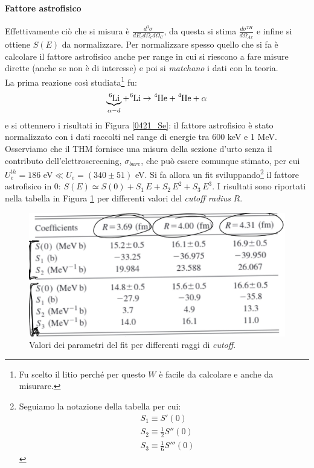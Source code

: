 \paragraph{Fattore astrofisico} Effettivamente ciò che si misura è $\frac{d^3\sigma}{dE_c d\Omega_cd\Omega_{C}}$, da questa si stima $\frac{d\sigma^{TH}}{d\Omega_{Ax}}$ e infine si ottiene $S(E)$ da normalizzare.
Per  normalizzare spesso quello che si fa è calcolare il fattore astrofisico anche per range in cui si riescono a fare misure dirette (anche se non è di interesse) e poi si \textit{matchano} i dati con la teoria.\\
La prima reazione così studiata\footnote{Fu scelto il litio perché per questo $W$ è facile da calcolare e anche da misurare.} fu:
$$ \underbrace{\ce{^6Li}}_{\alpha-d} + \ce{^6Li} \to \ce{^4He} + \ce{^4He} + \alpha $$
e si ottennero i risultati in Figura \ref{0421_Se}: il fattore astrofisico è stato normalizzato con i dati raccolti nel range di energie tra 600 keV e 1 MeV. Osserviamo che il THM fornisce una misura della sezione d'urto senza il contributo dell'elettroscreening, $\sigma_{bare}$, che può essere comunque stimato, per cui $U_e^{th}=186$ eV$\ll U_e = (340\pm 51)$ eV.
\noindent Si fa allora un fit sviluppando\footnote{Seguiamo la notazione della tabella per cui:%
\begin{align*}%
	&S_1 \equiv S'(0) \\
	&S_2 \equiv \frac{1}{2}S''(0) \\
	&S_3 \equiv \frac{1}{6}S'''(0) 
\end{align*}%
} il fattore astrofisico in 0: $S(E) \simeq S(0) + S_1 \, E + S_2 \, E^2 + S_3 \, E^3$. I risultati sono riportati nella tabella in Figura \ref{0421_tab} per differenti valori del \textit{cutoff radius} $R$.

\begin{figure}[h]
	\centering
	\includegraphics[scale=0.5]{Immagini/0421_tab.png}
	\caption{Valori dei parametri del fit per differenti raggi di \textit{cutoff}.}
	\label{0421_tab}
\end{figure}

